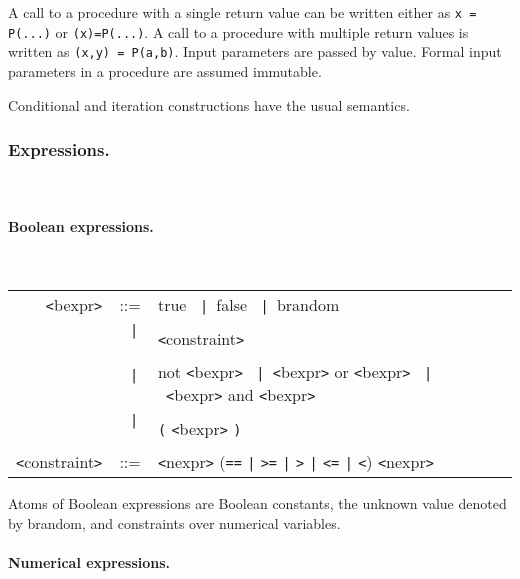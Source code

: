 \documentclass[a4paper,11pt]{article}
\newcommand{\pkw}[1]{\textcolor{progkeyword}{#1}}
\newcommand{\sx}[1]{\textcolor{prog}{\texttt{<}#1\texttt{>}}}
\newcommand{\tk}[1]{\textcolor{token}{\texttt{#1}}}
\newcommand{\sor}{\texttt{~|~}}
\newenvironment{syntax}
{
\T\medskip
\begin{tabular}{rcll}
}
{
\end{tabular}
\T\par\medskip
}
\begin{document}
A call to a procedure with a single return value can be written
either as \texttt{x = P(...)} or \texttt{(x)=P(...)}. A call to a
procedure with multiple return values is written as \texttt{(x,y)
  = P(a,b)}. Input parameters are passed by value. Formal input
parameters in a procedure are assumed immutable.

Conditional and iteration constructions have the usual semantics.

\subsubsection{Expressions.}\T~

\paragraph{Boolean expressions.}\T~

\begin{syntax}
  \sx{bexpr} &::=& \pkw{true} \sor \pkw{false} \sor \pkw{brandom} \\
  &\sor& \sx{constraint} \\
  &\sor& \pkw{not} \sx{bexpr} \sor \sx{bexpr} \pkw{or} \sx{bexpr} \sor \sx{bexpr} \pkw{and} \sx{bexpr} \\
  &\sor& \tk{(} \sx{bexpr} \tk{)} \\
  \sx{constraint} &::=& \sx{nexpr} (\tk{==} \texttt{|} \tk{>=} \texttt{|} \tk{>} \texttt{|} \tk{<=} \texttt{|} \tk{<}) \sx{nexpr}
\end{syntax}

Atoms of Boolean expressions are Boolean constants, the unknown
value denoted by \pkw{brandom}, and constraints over numerical
variables.

\paragraph{Numerical expressions.}\T~
\end{document}
